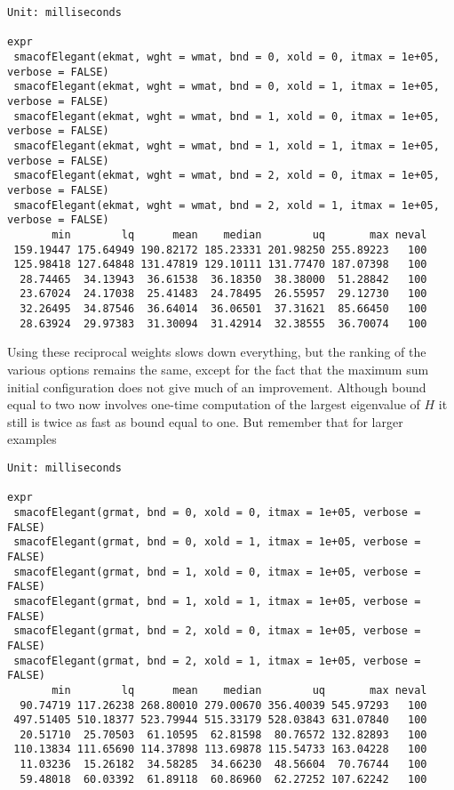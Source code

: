 \documentclass[
  12pt,
  letterpaper,
  DIV=11,
  numbers=noendperiod]{scrartcl}
\begin{document}
\begin{verbatim}
Unit: milliseconds
                                                                                      expr
 smacofElegant(ekmat, wght = wmat, bnd = 0, xold = 0, itmax = 1e+05,      verbose = FALSE)
 smacofElegant(ekmat, wght = wmat, bnd = 0, xold = 1, itmax = 1e+05,      verbose = FALSE)
 smacofElegant(ekmat, wght = wmat, bnd = 1, xold = 0, itmax = 1e+05,      verbose = FALSE)
 smacofElegant(ekmat, wght = wmat, bnd = 1, xold = 1, itmax = 1e+05,      verbose = FALSE)
 smacofElegant(ekmat, wght = wmat, bnd = 2, xold = 0, itmax = 1e+05,      verbose = FALSE)
 smacofElegant(ekmat, wght = wmat, bnd = 2, xold = 1, itmax = 1e+05,      verbose = FALSE)
       min        lq      mean    median        uq       max neval
 159.19447 175.64949 190.82172 185.23331 201.98250 255.89223   100
 125.98418 127.64848 131.47819 129.10111 131.77470 187.07398   100
  28.74465  34.13943  36.61538  36.18350  38.38000  51.28842   100
  23.67024  24.17038  25.41483  24.78495  26.55957  29.12730   100
  32.26495  34.87546  36.64014  36.06501  37.31621  85.66450   100
  28.63924  29.97383  31.30094  31.42914  32.38555  36.70074   100
\end{verbatim}

Using these reciprocal weights slows down everything, but the ranking of
the various options remains the same, except for the fact that the
maximum sum initial configuration does not give much of an improvement.
Although bound equal to two now involves one-time computation of the
largest eigenvalue of \(H\) it still is twice as fast as bound equal to
one. But remember that for larger examples

\begin{verbatim}
Unit: milliseconds
                                                                    expr
 smacofElegant(grmat, bnd = 0, xold = 0, itmax = 1e+05, verbose = FALSE)
 smacofElegant(grmat, bnd = 0, xold = 1, itmax = 1e+05, verbose = FALSE)
 smacofElegant(grmat, bnd = 1, xold = 0, itmax = 1e+05, verbose = FALSE)
 smacofElegant(grmat, bnd = 1, xold = 1, itmax = 1e+05, verbose = FALSE)
 smacofElegant(grmat, bnd = 2, xold = 0, itmax = 1e+05, verbose = FALSE)
 smacofElegant(grmat, bnd = 2, xold = 1, itmax = 1e+05, verbose = FALSE)
       min        lq      mean    median        uq       max neval
  90.74719 117.26238 268.80010 279.00670 356.40039 545.97293   100
 497.51405 510.18377 523.79944 515.33179 528.03843 631.07840   100
  20.51710  25.70503  61.10595  62.81598  80.76572 132.82893   100
 110.13834 111.65690 114.37898 113.69878 115.54733 163.04228   100
  11.03236  15.26182  34.58285  34.66230  48.56604  70.76744   100
  59.48018  60.03392  61.89118  60.86960  62.27252 107.62242   100
\end{verbatim}
\end{document}

